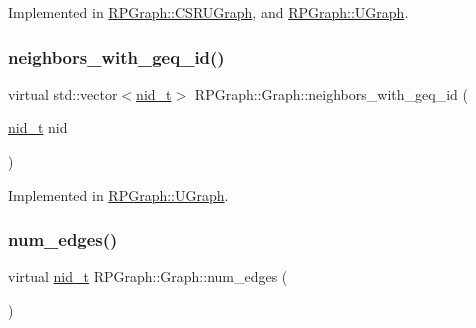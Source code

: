Implemented in \mbox{\hyperlink{classRPGraph_1_1CSRUGraph_a88965d72f2fbea43b6d731d2cc027858}{R\+P\+Graph\+::\+C\+S\+R\+U\+Graph}}, and \mbox{\hyperlink{classRPGraph_1_1UGraph_a5614092aab1bb8d92b625506f944d39c}{R\+P\+Graph\+::\+U\+Graph}}.

\mbox{\label{classRPGraph_1_1Graph_ab1e27e4268d36443a5db035fa7635cad}} 
\subsubsection{\texorpdfstring{neighbors\+\_\+with\+\_\+geq\+\_\+id()}{neighbors\_with\_geq\_id()}}
{\footnotesize\ttfamily virtual std\+::vector$<$\mbox{\hyperlink{namespaceRPGraph_ab3ae34f1ab88e48f43794c30c8697b74}{nid\+\_\+t}}$>$ R\+P\+Graph\+::\+Graph\+::neighbors\+\_\+with\+\_\+geq\+\_\+id (\begin{DoxyParamCaption}\item[{\mbox{\hyperlink{namespaceRPGraph_ab3ae34f1ab88e48f43794c30c8697b74}{nid\+\_\+t}}}]{nid }\end{DoxyParamCaption})\hspace{0.3cm}{\ttfamily [pure virtual]}}



Implemented in \mbox{\hyperlink{classRPGraph_1_1UGraph_a8cc5be5cfd41f351d4f98de816028f90}{R\+P\+Graph\+::\+U\+Graph}}.

\mbox{\label{classRPGraph_1_1Graph_acd3b877216686aff2f7fbc2d62bcdf9b}} 
\subsubsection{\texorpdfstring{num\+\_\+edges()}{num\_edges()}}
{\footnotesize\ttfamily virtual \mbox{\hyperlink{namespaceRPGraph_ab3ae34f1ab88e48f43794c30c8697b74}{nid\+\_\+t}} R\+P\+Graph\+::\+Graph\+::num\+\_\+edges (\begin{DoxyParamCaption}{ }\end{DoxyParamCaption})\hspace{0.3cm}{\ttfamily [pure virtual]}}



